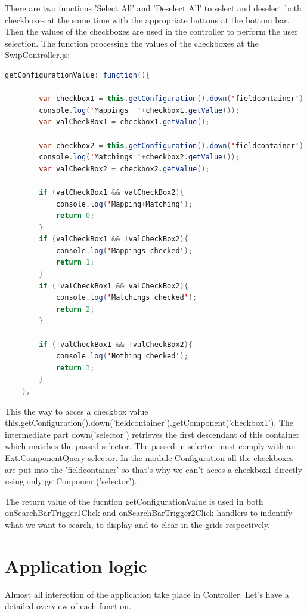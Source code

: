 \par There are two functions 'Select All' and 'Deselect All' to select and deselect both checkboxes at the same time with the appropriate buttons at the bottom bar. Then the values of the checkboxes are used in the controller to perform the user selection. The function processing the values of the checkboxes at the SwipController.js: \\
\begin{lstlisting}[language=Java]
getConfigurationValue: function(){

        var checkbox1 = this.getConfiguration().down('fieldcontainer').getComponent('checkbox1');
        console.log('Mappings  '+checkbox1.getValue());
        var valCheckBox1 = checkbox1.getValue();

        var checkbox2 = this.getConfiguration().down('fieldcontainer').getComponent('checkbox2');
        console.log('Matchings '+checkbox2.getValue());
        var valCheckBox2 = checkbox2.getValue();

        if (valCheckBox1 && valCheckBox2){
            console.log('Mapping+Matching');
            return 0;
        }
        if (valCheckBox1 && !valCheckBox2){
            console.log('Mappings checked');
            return 1;
        }
        if (!valCheckBox1 && valCheckBox2){
            console.log('Matchings checked');
            return 2;
        }

        if (!valCheckBox1 && !valCheckBox2){
            console.log('Nothing checked');
            return 3;
        }
    },
\end{lstlisting}
\par This the way to acces a checkbox value this.getConfiguration().down('fieldcontainer').getComponent('checkbox1'). The intermediate part down('selector') retrieves the first descendant of this container which matches the passed selector. The passed in selector must comply with an Ext.ComponentQuery selector. In the module Configuration all the checkboxes are put into the 'fieldcontainer' so that's why we can't acces a checkbox1 directly using only getConponent('selector').\\ 
\par The return value of the fucntion getConfigurationValue is used in both onSearchBarTrigger1Click and onSearchBarTrigger2Click handlers to indentify what we want to search, to display and to clear in the grids respectively.

\section{Application logic}
\par Almost all interection of the application take place in Controller. Let’s have a detailed overview of each function.\\ 

